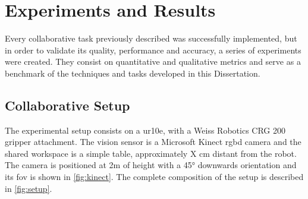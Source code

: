 \chapter{Experiments and Results}

\par Every collaborative task previously described was successfully implemented, but in order to validate its quality, performance and accuracy, a series of experiments were created. They consist on quantitative and qualitative metrics and serve as a benchmark of the techniques and tasks developed in this Dissertation.

\section{Collaborative Setup}

\par The experimental setup consists on a \ac{ur10e}, with a Weiss Robotics CRG 200 gripper attachment. The vision sensor is a Microsoft Kinect \acs{rgbd} camera and the shared workspace is a simple table, approximately  X cm distant from the robot. The camera is positioned at 2m of height with a \ang{45} downwards orientation and its \ac{fov} is shown in \autoref{fig:kinect}. The complete composition of the setup is described in \autoref{fig:setup}.


